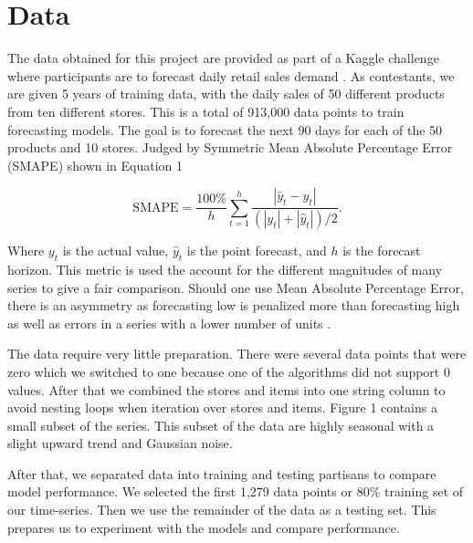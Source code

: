 \documentclass[16pt,twocolumn,letterpaper]{article}
\begin{document}
\section{Data}

The data obtained for this project are provided as part of a Kaggle challenge where participants are to forecast daily retail sales demand \cite{kaggle}. As contestants, we are given 5 years of training data, with the daily sales of 50 different products from ten different stores. This is a total of 913,000 data points to train forecasting models. The goal is to forecast the next 90 days for each of the 50 products and 10 stores. Judged by Symmetric Mean Absolute Percentage Error (SMAPE) shown in Equation 1

\begin{equation}
\textrm{SMAPE}={\frac {100\%}{h}}\sum _{t=1}^{h}{\frac {\left|\hat{y}_t-y_t\right|}{(|y_t|+|\hat{y}_t|)/2}}.
\end{equation}

Where $y_t$ is the actual value, $\hat{y}_t$ is the point forecast, and $h$ is the forecast horizon. This metric is used the account for the different magnitudes of many series to give a fair comparison. Should one use Mean Absolute Percentage Error, there is an asymmetry as forecasting low is penalized more than forecasting high as well as errors in a series with a lower number of units \cite{hyndman2006another}.

The data require very little preparation. There were several data points that were zero which we switched to one because one of the algorithms did not support 0 values. After that we combined the stores and items into one string column to avoid nesting loops when iteration over stores and items. Figure 1 contains a small subset of the series. This subset of the data are highly seasonal with a slight upward trend and Gaussian noise.

After that, we separated data into training and testing partisans to compare model performance. We selected the first 1,279 data points or 80\% training set of our time-series. Then we use the remainder of the data as a testing set. This prepares us to experiment with the models and compare performance. 
\end{document}
